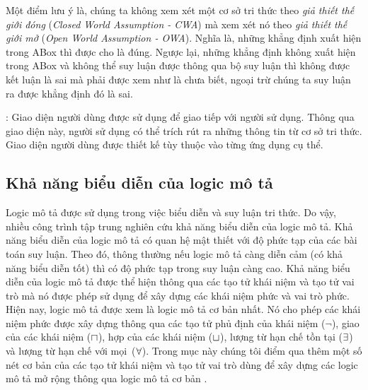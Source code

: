 Một điểm lưu ý là, chúng ta không xem xét một cơ sở tri thức theo {\em giả thiết thế giới đóng} ({\em Closed World Assumption - CWA}) mà xem xét nó theo {\em giả thiết thế giới mở} ({\em Open World Assumption - OWA}). Nghĩa là, những khẳng định xuất hiện trong ABox thì được cho là đúng. Ngược lại, những khẳng định không xuất hiện trong ABox và không thể suy luận được thông qua bộ suy luận thì không được kết luận là sai mà phải được xem như là chưa biết, ngoại trừ chúng ta suy luận ra được khẳng định đó là sai.
	
: Giao diện người dùng được sử dụng để giao tiếp với người sử dụng. Thông qua giao diện này, người sử dụng có thể trích rút ra những thông tin từ cơ sở tri thức. Giao diện người dùng được thiết kế tùy thuộc vào từng ứng dụng cụ thể.  

\subsection{Khả năng biểu diễn của logic mô tả}
\label{sec:Chap1.Expressiveness}
Logic mô tả được sử dụng trong việc biểu diễn và suy luận tri thức. Do vậy, nhiều công trình tập trung nghiên cứu khả năng biểu diễn của logic mô tả. Khả năng biểu diễn của logic mô tả có quan hệ mật thiết với độ phức tạp của các bài toán suy luận. Theo đó, thông thường nếu logic mô tả càng diễn cảm (có khả năng biểu diễn tốt) thì có độ phức tạp trong suy luận càng cao. Khả năng biểu diễn của logic mô tả được thể hiện thông qua các tạo tử khái niệm và tạo tử vai trò mà nó được phép sử dụng để xây dựng các khái niệm phức và vai trò phức. 
Hiện nay, logic mô tả \ALC được xem là logic mô tả cơ bản nhất. Nó cho phép các khái niệm phức được xây dựng thông qua các tạo tử phủ định của khái niệm ($\neg$), giao của các khái niệm ($\sqcap$), hợp của các khái niệm ($\sqcup$), lượng từ hạn chế tồn tại ($\exists$) và lượng từ hạn chế với mọi~($\forall$).
Trong mục này chúng tôi điểm qua thêm một số nét cơ bản của các tạo tử khái niệm và tạo tử vai trò dùng để xây dựng các logic mô tả mở rộng thông qua logic mô tả cơ bản \ALC.

